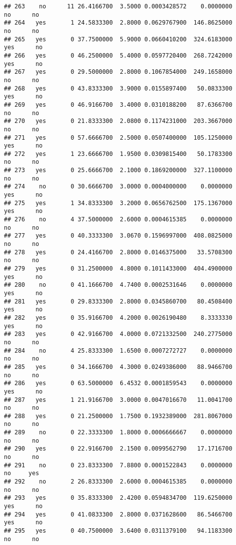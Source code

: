 \documentclass[]{article}
\begin{document}
\begin{verbatim}
## 263    no      11 26.4166700  3.5000 0.0003428572    0.0000000    no      no
## 264   yes       1 24.5833300  2.8000 0.0629767900  146.8625000    no      no
## 265   yes       0 37.7500000  5.9000 0.0660410200  324.6183000   yes      no
## 266   yes       0 46.2500000  5.4000 0.0597720400  268.7242000   yes      no
## 267   yes       0 29.5000000  2.8000 0.1067854000  249.1658000    no      no
## 268   yes       0 43.8333300  3.9000 0.0155897400   50.0833300   yes      no
## 269   yes       0 46.9166700  3.4000 0.0310188200   87.6366700    no      no
## 270   yes       0 21.8333300  2.0800 0.1174231000  203.3667000    no      no
## 271   yes       0 57.6666700  2.5000 0.0507400000  105.1250000   yes      no
## 272   yes       1 23.6666700  1.9500 0.0309815400   50.1783300    no      no
## 273   yes       0 25.6666700  2.1000 0.1869200000  327.1100000    no      no
## 274    no       0 30.6666700  3.0000 0.0004000000    0.0000000   yes      no
## 275   yes       1 34.8333300  3.2000 0.0656762500  175.1367000   yes      no
## 276    no       4 37.5000000  2.6000 0.0004615385    0.0000000    no      no
## 277   yes       0 40.3333300  3.0670 0.1596997000  408.0825000    no      no
## 278   yes       0 24.4166700  2.8000 0.0146375000   33.5708300    no      no
## 279   yes       0 31.2500000  4.8000 0.1011433000  404.4900000   yes      no
## 280    no       0 41.1666700  4.7400 0.0002531646    0.0000000   yes      no
## 281   yes       0 29.8333300  2.8000 0.0345860700   80.4508400   yes      no
## 282   yes       0 35.9166700  4.2000 0.0026190480    8.3333330   yes      no
## 283   yes       0 42.9166700  4.0000 0.0721332500  240.2775000    no      no
## 284    no       4 25.8333300  1.6500 0.0007272727    0.0000000    no      no
## 285   yes       0 34.1666700  4.3000 0.0249386000   88.9466700    no      no
## 286   yes       0 63.5000000  6.4532 0.0001859543    0.0000000   yes      no
## 287   yes       1 21.9166700  3.0000 0.0047016670   11.0041700    no      no
## 288   yes       0 21.2500000  1.7500 0.1932389000  281.8067000    no      no
## 289    no       0 22.3333300  1.8000 0.0006666667    0.0000000    no      no
## 290   yes       0 22.9166700  2.1500 0.0099562790   17.1716700    no      no
## 291    no       0 23.8333300  7.8800 0.0001522843    0.0000000    no     yes
## 292    no       2 26.8333300  2.6000 0.0004615385    0.0000000    no      no
## 293   yes       0 35.8333300  2.4200 0.0594834700  119.6250000   yes      no
## 294   yes       0 41.0833300  2.8000 0.0371628600   86.5466700   yes      no
## 295   yes       0 40.7500000  3.6400 0.0311379100   94.1183300    no      no

\end{verbatim}
\end{document}
